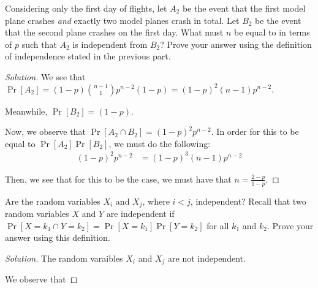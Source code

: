 \documentclass{article}
\newenvironment{solution}{\begin{proof}[Solution]}{\end{proof}}
\begin{document}
\begin{hw}
	Considering only the first day of flights, let $A_2$ be the event that the first model plane crashes 
	\emph{and} exactly two model planes crash in total. Let $B_2$ be the event that 
	the second plane crashes on the first day. What must $n$ be equal to 
	in terms of $p$ such that $A_2$ is independent from $B_2$? Prove your answer using the definition 
	of independence stated in the previous part.
\end{hw}
\begin{solution}
	We see that $\Pr[A_{2}] = (1-p)\binom{n-1}{1}p^{n-2}(1-p) = (1-p)^{2}(n-1)p^{n-2}$.
	
	Meanwhile, $\Pr[B_{2}] = (1-p)$.
	
	Now, we observe that $\Pr[A_{2} \cap B_{2}] = (1-p)^{2}p^{n-2}$. In order for this to be equal to $\Pr[A_{2}]\Pr[B_{2}]$, we must do the following:
	\begin{align*}
		(1-p)^{2}p^{n-2} &= (1-p)^{3}(n-1)p^{n-2}
	\end{align*}

	Then, we see that for this to be the case, we must have that $n = \frac{2-p}{1-p}$.
\end{solution}

\begin{hw}
	Are the random variables $X_i$ and $X_j$, where $i<j$, independent? Recall that two random variables $X$ and $Y$ are independent if $\Pr[X=k_1 \cap Y=k_2] = \Pr[X=k_1]\Pr[Y=k_2]$ for all $k_1$ and $k_2$. Prove your answer using this definition.
\end{hw}
\begin{solution}
	The random varaibles $X_{i}$ and $X_{j}$ are not independent.
	
	We observe that 
\end{solution}
\end{document}
